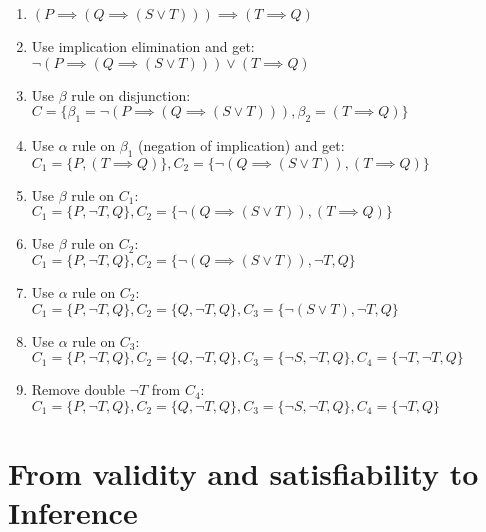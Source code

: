 \documentclass{article}
\begin{document}
\begin{itemize}
    \begin{enumerate}
        \item $(P \implies (Q \implies (S \lor T))) \implies (T \implies Q)$
        \item Use implication elimination and get: \\
        $\neg (P \implies (Q \implies (S \lor T))) \lor (T \implies Q)$
        \item Use $\beta$ rule on disjunction: \\
        $C=\{\beta_1=\neg(P \implies (Q \implies (S \lor T))), \beta_2=(T \implies Q)\}$
        \item Use $\alpha$ rule on $\beta_1$ (negation of implication) and get: \\
        $C_1=\{P, (T \implies Q)\}, C_2=\{\neg(Q \implies (S \lor T)), (T \implies Q)\}$
        \item Use $\beta$ rule on $C_1$: \\
        $C_1=\{P, \neg T, Q\}, C_2=\{\neg(Q \implies (S \lor T)), (T \implies Q)\}$
        \item Use $\beta$ rule on $C_2$: \\
        $C_1=\{P, \neg T, Q\}, C_2=\{\neg(Q \implies (S \lor T)), \neg T, Q\}$
        \item Use $\alpha$ rule on $C_2$: \\
        $C_1=\{P, \neg T, Q\}, C_2=\{Q, \neg T, Q\}, C_3=\{\neg(S \lor T), \neg T, Q\}$
        \item Use $\alpha$ rule on $C_3$: \\
        $C_1=\{P, \neg T, Q\}, C_2=\{Q, \neg T, Q\}, C_3=\{\neg S, \neg T, Q\}, C_4=\{\neg T, \neg T, Q\}$
        \item Remove double $\neg T$ from $C_4$: \\
        $C_1=\{P, \neg T, Q\}, C_2=\{Q, \neg T, Q\}, C_3=\{\neg S, \neg T, Q\}, C_4=\{\neg T, Q\}$
    \end{enumerate}
    
\end{itemize}

\newpage

\section{From validity and satisfiability to Inference}
\end{document}
